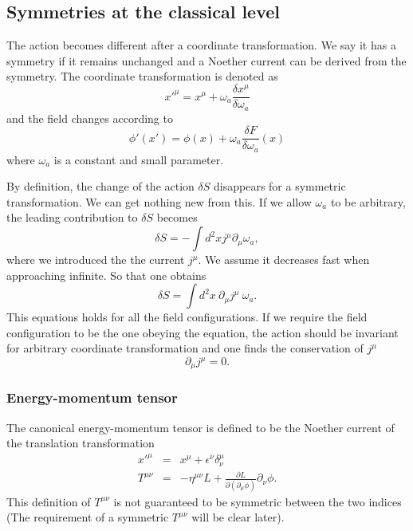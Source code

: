 \documentclass[submission, PhysLectNotes]{SciPost}
\begin{document}
\subsection{Symmetries at the classical level}
The action becomes different after a coordinate transformation. We say it has a symmetry if it remains unchanged and a Noether current can be derived from the symmetry. The coordinate transformation is denoted as
\begin{equation}
    x'^\mu = x^\mu + \omega_a \frac{\delta x^\mu}{\delta \omega_a}
\end{equation}
and the field changes according to 
\begin{equation}
    \phi'(x') = \phi(x) + \omega_a \frac{\delta F}{\delta \omega_a}(x)
\end{equation}
where $\omega_a$ is a constant and small parameter.

By definition, the change of the action $\delta S$ disappears for a symmetric transformation. We can get nothing new from this. If we allow $\omega_a$ to be arbitrary, the leading contribution to $\delta S$ becomes
\begin{equation}
    \delta S = -\int d^2x j^\mu \partial_\mu \omega_a,  
\end{equation}
where we introduced the the current $j^\mu$. We assume it decreases fast when approaching infinite. So that one obtains 
\begin{equation}
    \delta S = \int d^2x\ \partial_\mu j^\mu \ \omega_a.
\end{equation}
This equations holds for all the field configurations. If we require the field configuration to be the one obeying the equation, the action should be invariant for arbitrary coordinate transformation and one finds the conservation of $j^\mu$
\begin{equation}
    \partial_\mu j^\mu = 0.
\end{equation}

\subsubsection{Energy-momentum tensor}
The canonical energy-momentum tensor is defined to be the Noether current of the translation transformation
\begin{eqnarray}
    x'^\mu &=& x^\mu + \epsilon^\nu \delta^\mu_\nu \\
    T^{\mu\nu} &=& -\eta^{\mu\nu} L + \frac{\partial L}{\partial(\partial_\mu \phi)}\partial_\nu \phi.
\end{eqnarray}
This definition of $T^{\mu\nu}$ is not guaranteed to be symmetric between the two indices (The requirement of a symmetric $T^{\mu\nu}$ will be clear later). 
\end{document}
